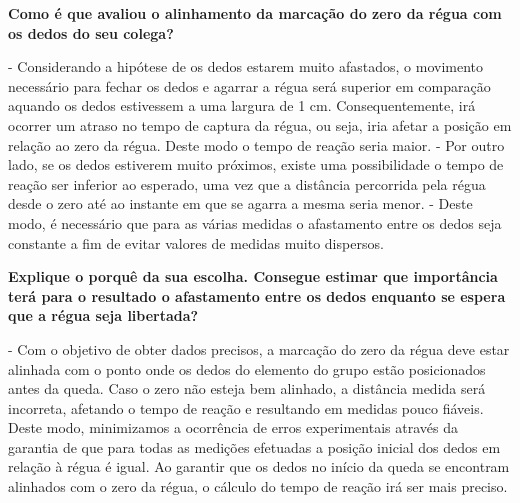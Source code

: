 \vfill
{}


\textbf{Como é que avaliou o alinhamento da marcação do zero da régua com os dedos do seu colega?}


- Considerando a hipótese de os dedos estarem muito afastados, o movimento necessário para fechar os dedos e agarrar a régua será superior em comparação aquando os dedos estivessem a uma largura de 1 cm. Consequentemente, irá ocorrer um atraso no tempo de captura da régua, ou seja, iria afetar a posição em relação ao zero da régua. Deste modo o tempo de reação seria maior.
- Por outro lado, se os dedos estiverem muito próximos, existe uma possibilidade o tempo de reação ser inferior ao esperado, uma vez que a distância percorrida pela régua desde o zero até ao instante em que se agarra a mesma seria menor. 
- Deste modo, é necessário que para as várias medidas o afastamento entre os dedos seja constante a fim de evitar valores de medidas muito dispersos.
\\

\textbf{Explique o porquê da sua escolha. Consegue estimar que importância terá para o resultado o afastamento entre os dedos enquanto se espera que a régua seja libertada? }

- Com o objetivo de obter dados precisos, a marcação do zero da régua deve estar alinhada com o ponto onde os dedos do elemento do grupo estão posicionados antes da queda. Caso o zero não esteja bem alinhado, a distância medida será incorreta, afetando o tempo de reação e resultando em medidas pouco fiáveis. Deste modo, minimizamos a ocorrência de erros experimentais através da garantia de que para todas as medições efetuadas a posição inicial dos dedos em relação à régua é igual. Ao garantir que os dedos no início da queda se encontram alinhados com o zero da régua, o cálculo do tempo de reação irá ser mais preciso. 

